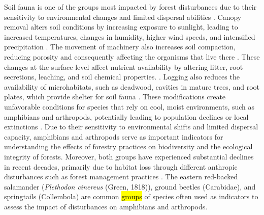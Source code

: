 Soil fauna is one of the groups most impacted by forest disturbances due to their sensitivity to environmental changes and limited dispersal abilities \citep{Marshall2000Impactsforest,Coyle2017Soilfauna}. 
Canopy removal alters soil conditions by increasing exposure to sunlight, leading to increased temperatures, changes in humidity, higher wind speeds, and intensified precipitation \citep{Keenan1993ecologicaleffects,Heithecker2007Edgerelatedgradients,Lindo2003Microbialbiomass,Brook2008Synergiesextinction,Zhang2022Intensiveforest}. 
The movement of machinery also increases soil compaction, reducing porosity and consequently affecting the organisms that live there \citep{Battigelli2004Shorttermimpact,Mazerolle2021Woodlandsalamander}. 
These changes at the surface level affect nutrient availability by altering litter, root secretions, leaching, and soil chemical properties. \citep{Covington1981Changesforest,Marshall2000Impactsforest,Lindo2003Microbialbiomass,Battigelli2004Shorttermimpact}. 
Logging also reduces the availability of microhabitats, such as deadwood, cavities in mature trees, and root plates, which provide shelter for soil fauna \citep{Spies1999Dynamicforest,Christensen2005Deadwood,Brassard2008EffectsForest}. 
These modifications create unfavorable conditions for species that rely on cool, moist environments, such as amphibians and arthropods, potentially leading to population declines or local extinctions \citep{Paillet2010Biodiversitydifferences,Fedrowitz2014Canretention,Chaudhary2016Impactforest}. 
Due to their sensitivity to environmental shifts and limited dispersal capacity, amphibians and arthropods serve as important indicators for understanding the effects of forestry practices on biodiversity and the ecological integrity of forests. 
Moreover, both groups have experienced substantial declines in recent decades, primarily due to habitat loss through different anthropic disturbances such as forest management practices \citep{Houlahan2000Quantitativeevidence,Stuart2004Statustrends,Wagner2021Insectdecline}. 
The eastern red-backed salamander (\textit{Plethodon cinereus} (Green, 1818)), ground beetles (Carabidae), and springtails (Collembola) are common \hl{groups} of species often used as indicators to assess the impact of disturbances on amphibians and arthropods. 


